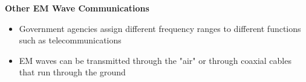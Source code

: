 \textbf{Other EM Wave Communications}
\begin{itemize}
    \item Government agencies assign different frequency ranges to different functions such as telecommunications
    \item EM waves can be transmitted through the "air" or through coaxial cables that run through the ground
\end{itemize}

\newpage